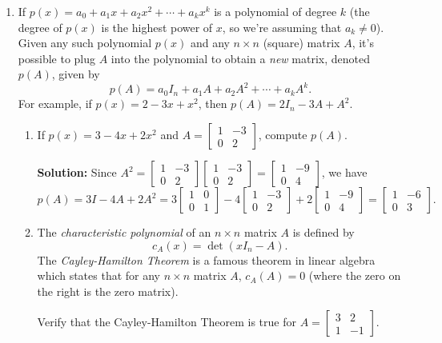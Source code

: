 \documentclass[letterpaper,12pt]{article}
\begin{document}
\begin{enumerate}
\bigskip

\item If $p(x)=a_0+a_1x+a_2x^2+\cdots + a_kx^k$ is a polynomial of degree $k$ (the degree of $p(x)$ is the highest power of $x$, so we're assuming that $a_k\neq 0$). Given any such polynomial $p(x)$ and any $n\times n$ (square) matrix $A$, it's possible to plug $A$ into the polynomial to obtain a {\em new} matrix, denoted $p(A)$, given by
\[
 p(A)=a_0I_n+a_1A+a_2A^2+\cdots + a_kA^k.
\]
For example, if $p(x)=2-3x+x^2$, then $p(A) = 2I_n-3A+A^2$.
\begin{enumerate}
 \item If $p(x) = 3-4x+2x^2$ and $A=\begin{bmatrix}1&-3\\0&2\end{bmatrix}$, compute $p(A)$.

\bigskip

{\bf Solution:} Since $A^2 = \begin{bmatrix}1&-3\\0&2\end{bmatrix}\begin{bmatrix}1&-3\\0&2\end{bmatrix}=\begin{bmatrix}1&-9\\0&4\end{bmatrix}$, we have
\[
 p(A) = 3I-4A+2A^2 = 3\begin{bmatrix}1&0\\0&1\end{bmatrix}-4\begin{bmatrix}1&-3\\0&2\end{bmatrix}+2\begin{bmatrix}1&-9\\0&4\end{bmatrix} = \begin{bmatrix}1&-6\\0&3\end{bmatrix}.
\]

\bigskip

 \item The {\em characteristic polynomial} of an $n\times n$ matrix $A$ is defined by
\[
 c_A(x) = \det(xI_n-A).
\]
 The {\em Cayley-Hamilton Theorem} is a famous theorem in linear algebra which states that for any $n\times n$ matrix $A$, $c_A(A) = 0$ (where the zero on the right is the zero matrix).

Verify that the Cayley-Hamilton Theorem is true for $A=\begin{bmatrix}3&2\\1&-1\end{bmatrix}$.


\end{enumerate}
\end{enumerate}
\end{document}
